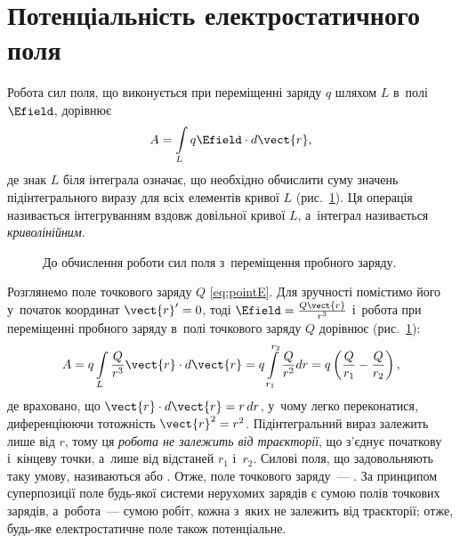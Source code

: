 \section{Потенціальність електростатичного поля}\label{sec:potentiallity}\hypertarget{electrostatic-field-potentiality}{}

Робота сил поля, що виконується при переміщенні заряду $q$ шляхом $L$ в~полі $\Efield$,
дорівнює
\begin{equation*}
	A = \int\limits_L q\Efield \cdot d\vect{r},
\end{equation*}
де знак $L$ біля інтеграла означає, що необхідно обчислити суму значень підінтегрального
виразу для всіх елементів кривої $L$ (рис.~\ref{tikz:A}). Ця операція називається
інтегруванням вздовж довільної кривої $L$, а~інтеграл називається \emph{криволінійним}.


\begin{figure}
	\centering
	\caption{До обчислення роботи сил поля з~переміщення пробного заряду.}
	\label{tikz:A}
\end{figure}

Розглянемо поле точкового заряду $Q$ \eqref{eq:pointE}. Для зручності помістимо його
у~початок координат $\vect{r}' = 0$, тоді $\Efield = \frac{Q\vect{r}}{r^3}$ і~робота при
переміщенні пробного заряду в~полі точкового заряду $Q$ дорівнює (рис.~\ref{tikz:A}):
\begin{equation}\label{eq:Ainitial}
	A = q \int\limits_L \frac{Q}{r^3}\vect{r}\cdot d\vect{r} = q\int\limits_{r_1}^{r_2} \frac{Q}{r^2} dr = q\left(\frac{Q}{r_1} - \frac{Q}{r_2}\right),
\end{equation}
де враховано, що $\vect{r}\cdot d\vect{r} = r\,dr$, у~чому легко переконатися,
диференціюючи тотожність $\vect{r}^2 = r^2$. Підінтегральний вираз залежить лише від $r$,
тому ця \emph{робота не залежить від траєкторії}, що з'єднує початкову і~кінцеву точки,
а~лише від відстаней $r_1$ і~$r_2$. Силові поля, що задовольняють таку умову,
називаються  або . Отже, поле точкового
заряду~--- . За принципом суперпозиції поле будь-якої системи нерухомих
зарядів є сумою полів точкових зарядів, а~робота~--- сумою робіт, кожна з~яких не залежить
від траєкторії; отже, будь-яке електростатичне поле також потенціальне.

